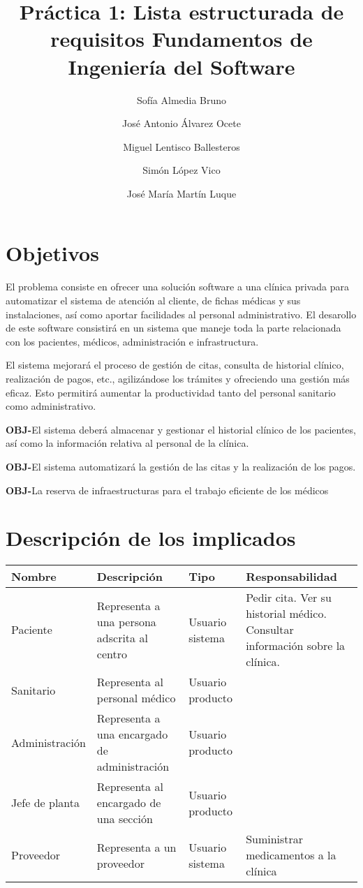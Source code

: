 \documentclass[12pt,a4paper]{article}
\title{Práctica 1: Lista estructurada de requisitos \large Fundamentos de Ingeniería del Software}
\author{Sofía Almedia Bruno \and José Antonio Álvarez Ocete \and Miguel Lentisco Ballesteros \and Simón López Vico \and José María Martín Luque}
\newcounter{ObjCounter}
\newcommand{\obj}[1]{\addtocounter{ObjCounter}{1}\textbf{\rmfamily OBJ-\theObjCounter}\quad#1\\}
\begin{document}
\maketitle

\section{Objetivos} %
\label{sec:estudio_del_dominio_del_problema}

El problema consiste en ofrecer una solución software a una clínica privada para automatizar el sistema de atención al cliente, de fichas médicas y sus instalaciones, así como aportar facilidades al personal administrativo. El desarollo de este software consistirá en un sistema que maneje toda la parte relacionada con los pacientes, médicos, administración e infrastructura.

El sistema mejorará el proceso de gestión de citas, consulta de historial clínico, realización de pagos, etc., agilizándose los trámites y ofreciendo una gestión más eficaz. Esto permitirá aumentar la productividad tanto del personal sanitario como administrativo.

\obj{El sistema deberá almacenar y gestionar el historial clínico de  los pacientes, así como la información relativa al personal de la clínica.}
\obj{El sistema automatizará la gestión de las citas y la realización de los pagos.}
\obj{La reserva de infraestructuras para el trabajo eficiente de los médicos}

\section{Descripción de los implicados} %
\label{sec:descripción_de_los_implicados}
\begin{adjustbox}{center}
	\begin{tabular}{l>{\raggedright}p{4cm}l>{\raggedright}p{4cm}}
		\bfseries Nombre &\bfseries Descripción &\bfseries Tipo &\bfseries Responsabilidad \tabularnewline\hline
		Paciente & Representa a una persona adscrita al centro & Usuario sistema & Pedir cita. Ver su historial médico. Consultar información sobre la clínica. \tabularnewline
		Sanitario & Representa al personal médico & Usuario producto & \tabularnewline
		Administración & Representa a una encargado de administración & Usuario producto & \tabularnewline
		Jefe de planta & Representa al encargado de una sección & Usuario producto & \tabularnewline
		Proveedor & Representa a un proveedor & Usuario sistema & Suministrar medicamentos a la clínica
	\end{tabular}
\end{adjustbox}
\end{document}
